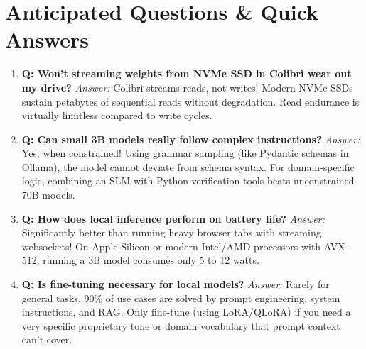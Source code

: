 \documentclass[11pt,a4paper]{article}
\begin{document}
\section*{Anticipated Questions \& Quick Answers}
\begin{enumerate}
    \item \textbf{Q: Won't streaming weights from NVMe SSD in Colibr\`i wear out my drive?}  
    \textit{Answer:} Colibr\`i streams reads, not writes! Modern NVMe SSDs sustain petabytes of sequential reads without degradation. Read endurance is virtually limitless compared to write cycles.
    \item \textbf{Q: Can small 3B models really follow complex instructions?}  
    \textit{Answer:} Yes, when constrained! Using grammar sampling (like Pydantic schemas in Ollama), the model cannot deviate from schema syntax. For domain-specific logic, combining an SLM with Python verification tools beats unconstrained 70B models.
    \item \textbf{Q: How does local inference perform on battery life?}  
    \textit{Answer:} Significantly better than running heavy browser tabs with streaming websockets! On Apple Silicon or modern Intel/AMD processors with AVX-512, running a 3B model consumes only 5 to 12 watts.
    \item \textbf{Q: Is fine-tuning necessary for local models?}  
    \textit{Answer:} Rarely for general tasks. 90\% of use cases are solved by prompt engineering, system instructions, and RAG. Only fine-tune (using LoRA/QLoRA) if you need a very specific proprietary tone or domain vocabulary that prompt context can't cover.
\end{enumerate}
\end{document}
